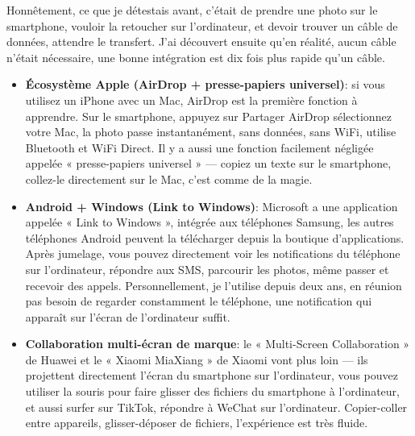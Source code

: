 


Honnêtement, ce que je détestais avant, c'était de prendre une photo sur le smartphone, vouloir la retoucher sur l'ordinateur, et devoir trouver un câble de données, attendre le transfert. J'ai découvert ensuite qu'en réalité, aucun câble n'était nécessaire, une bonne intégration est dix fois plus rapide qu'un câble.

\begin{itemize}
  \item \textbf{Écosystème Apple (AirDrop + presse-papiers universel)}: si vous utilisez un iPhone avec un Mac, AirDrop est la première fonction à apprendre. Sur le smartphone, appuyez sur Partager AirDrop sélectionnez votre Mac, la photo passe instantanément, sans données, sans WiFi, utilise Bluetooth et WiFi Direct. Il y a aussi une fonction facilement négligée appelée « presse-papiers universel » — copiez un texte sur le smartphone, collez-le directement sur le Mac, c'est comme de la magie.
  \item \textbf{Android + Windows (Link to Windows)}: Microsoft a une application appelée « Link to Windows », intégrée aux téléphones Samsung, les autres téléphones Android peuvent la télécharger depuis la boutique d'applications. Après jumelage, vous pouvez directement voir les notifications du téléphone sur l'ordinateur, répondre aux SMS, parcourir les photos, même passer et recevoir des appels. Personnellement, je l'utilise depuis deux ans, en réunion pas besoin de regarder constamment le téléphone, une notification qui apparaît sur l'écran de l'ordinateur suffit.
  \item \textbf{Collaboration multi-écran de marque}: le « Multi-Screen Collaboration » de Huawei et le « Xiaomi MiaXiang » de Xiaomi vont plus loin — ils projettent directement l'écran du smartphone sur l'ordinateur, vous pouvez utiliser la souris pour faire glisser des fichiers du smartphone à l'ordinateur, et aussi surfer sur TikTok, répondre à WeChat sur l'ordinateur. Copier-coller entre appareils, glisser-déposer de fichiers, l'expérience est très fluide.
\end{itemize}

